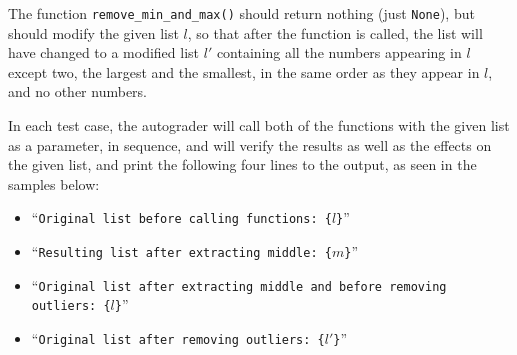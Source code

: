 The function \texttt{remove\_min\_and\_max()}
should return nothing (just \texttt{None}),
but should modify the given list $l$,
so that after the function is called,
the list will have changed to a modified list $l'$
containing all the numbers appearing in $l$
except two, the largest and the smallest,
in the same order as they appear in $l$,
and no other numbers.

In each test case, the autograder will call both of the functions
with the given list as a parameter, in sequence,
and will verify the results as well as the effects on the given list,
and print the following four lines to the output,
as seen in the samples below:
\begin{itemize}
    \item
    ``\texttt{Original list before calling functions: \{$l$\}}''

    \item
    ``\texttt{Resulting list after extracting middle: \{$m$\}}''

    \item
    ``\texttt{Original list after extracting middle and before removing outliers: \{$l$\}}''

    \item
    ``\texttt{Original list after removing outliers: \{$l'$\}}''
\end{itemize}
